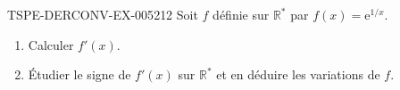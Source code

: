 \begin{exercice}{TSPE-DERCONV-EX-005}{2}{12}
Soit $f$ définie sur $\mathbb{R}^*$ par $f(x) = \mathrm{e}^{1/x}$.
\begin{enumerate}
  \item Calculer $f'(x)$.
  \item Étudier le signe de $f'(x)$ sur $\mathbb{R}^*$ et en déduire les variations de $f$.
\end{enumerate}

\end{exercice}
